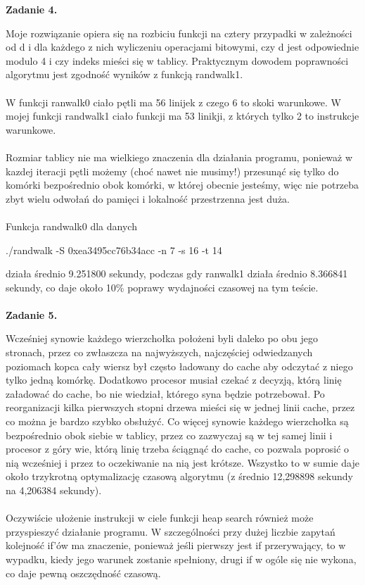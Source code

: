 \documentclass[a4paper]{article}
\begin{document}
\textbf{Zadanie 4.}

Moje rozwiązanie opiera się na rozbiciu funkcji na cztery przypadki w zależności od d i dla każdego z nich wyliczeniu operacjami bitowymi, czy d jest odpowiednie modulo 4 i czy indeks mieści się w tablicy. Praktycznym dowodem poprawności algorytmu jest zgodność wyników z funkcją randwalk1.\\\\
W funkcji ranwalk0 ciało pętli ma 56 linijek z czego 6 to skoki warunkowe. W mojej funkcji randwalk1 ciało funkcji ma 53 linikji, z których tylko 2 to instrukcje warunkowe.\\\\
Rozmiar tablicy nie ma wielkiego znaczenia dla działania programu, ponieważ w kazdej iteracji pętli możemy (choć nawet nie musimy!) przesunąć się tylko do komórki bezpośrednio obok komórki, w której obecnie jesteśmy, więc nie potrzeba zbyt wielu odwołań do pamięci i lokalność przestrzenna jest duża.\\\\
Funkcja randwalk0 dla danych
\begin{center}
./randwalk -S  0xea3495cc76b34acc  -n 7 -s 16 -t 14
\end{center}
działa średnio 9.251800 sekundy, podczas gdy ranwalk1 działa średnio 8.366841 sekundy, co daje około 10\% poprawy wydajności czasowej na tym teście.\\\\

\textbf{Zadanie 5.}

Wcześniej synowie każdego wierzchołka położeni byli daleko po obu jego stronach, przez co zwłaszcza na najwyższych, najczęściej odwiedzanych poziomach kopca cały wiersz był często ładowany do cache aby odczytać z niego tylko jedną komórkę. Dodatkowo procesor musiał czekać z decyzją, którą linię załadować do cache, bo nie wiedział, którego syna będzie potrzebował. Po reorganizacji kilka pierwszych stopni drzewa mieści się w jednej linii cache, przez co można je bardzo szybko obsłużyć. Co więcej synowie każdego wierzchołka są bezpośrednio obok siebie w tablicy, przez co zazwyczaj są w tej samej linii i procesor z góry wie, którą linię trzeba ściągnąć do cache, co pozwala poprosić o nią wcześniej i przez to oczekiwanie na nią jest krótsze. Wszystko to w sumie daje około trzykrotną optymalizację czasową algorytmu (z średnio 12,298898 sekundy na 4,206384 sekundy).\\\\
Oczywiście ułożenie instrukcji w ciele funkcji heap search również może przyspieszyć działanie programu. W szczególności przy dużej liczbie zapytań kolejność if'ów ma znaczenie, ponieważ jeśli pierwszy jest if przerywający, to w wypadku, kiedy jego warunek zostanie spełniony, drugi if w ogóle się nie wykona, co daje pewną oszczędność czasową.\\\\
\end{document}

